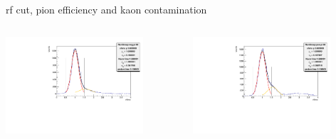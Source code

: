 \documentclass[aspectratio=169,xcolor=dvipsnames]{beamer}
\begin{document}
\begin{frame}{rf cut, pion efficiency and kaon contamination}
  \begin{columns}
    \begin{column}[T]{0.5\textwidth}
  \includegraphics[width = 0.8\textwidth]{results/pid/rftime/rftime_neg_80_pi.pdf}
\end{column}
\begin{column}[T]{0.5\textwidth}
  \includegraphics[width = 0.8\textwidth]{results/pid/rftime/rftime_pos_80_pi.pdf}
\end{column}
\end{columns}
\end{frame}
\end{document}
